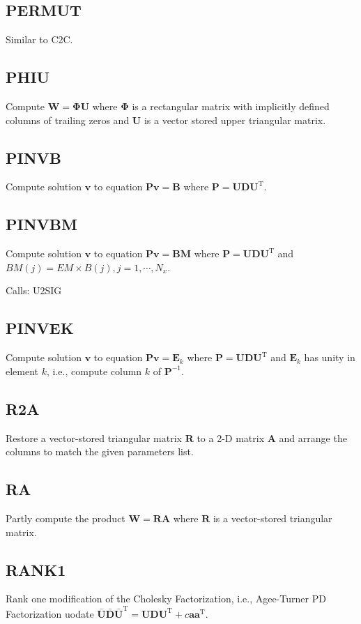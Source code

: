 \documentclass[./doc.tex]{subfiles}
\begin{document}
\subsection{PERMUT}
Similar to C2C.

\subsection{PHIU}
Compute \(\bm{W}=\bm{\Phi}\bm{U}\) where \(\bm{\Phi}\) is a rectangular matrix with implicitly
defined columns of trailing zeros and \(\bm{U}\) is a vector stored upper triangular matrix.

\subsection{PINVB}
Compute solution \(\bm{v}\) to equation \(\bm{P}\bm{v}=\bm{B}\) where \(\bm{P}=\bm{U}\bm{D}\bm{U}^{\textrm{T}}\).

\subsection{PINVBM}
Compute solution \(\bm{v}\) to equation \(\bm{P}\bm{v}=\bm{BM}\) where
\(\bm{P}=\bm{U}\bm{D}\bm{U}^{\textrm{T}}\) and \(BM(j)=EM\times B(j), j=1,\cdots, N_x\).

Calls: U2SIG

\subsection{PINVEK}
Compute solution \(\bm{v}\) to equation \(\bm{P}\bm{v}=\bm{E}_k\) where
\(\bm{P}=\bm{U}\bm{D}\bm{U}^{\textrm{T}}\) and \(\bm{E}_k\) has unity in element \(k\), i.e.,
compute column \(k\) of \(\bm{P}^{-1}\).

\subsection{R2A}
Restore a vector-stored triangular matrix \(\bm{R}\) to a 2-D matrix \(\bm{A}\) and
arrange the columns to match the given parameters list.

\subsection{RA}
Partly compute the product \(\bm{W}=\bm{R}\bm{A}\) where \(\bm{R}\) is a vector-stored triangular
matrix.

\subsection{RANK1}
Rank one modification of the Cholesky Factorization, i.e., Agee-Turner PD Factorization uodate
\(\bm{\bar{U}} \bm{\bar{D}} \bm{\bar{U}}^{\textrm{T}}=\bm{U} \bm{D} \bm{U}^{\textrm{T}} + c \bm{a} \bm{a}^{\textrm{T}}\).
\end{document}
